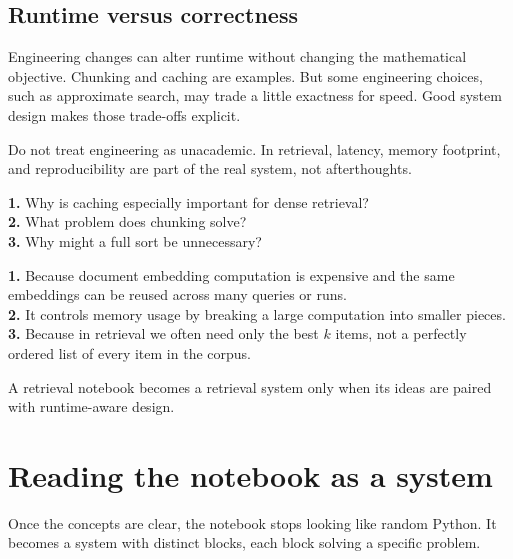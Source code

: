 \documentclass[11pt,oneside]{report}
\begin{document}
\section*{Runtime versus correctness}
Engineering changes can alter runtime without changing the mathematical objective. Chunking and caching are examples. But some engineering choices, such as approximate search, may trade a little exactness for speed. Good system design makes those trade-offs explicit.

\begin{warningbox}
Do not treat engineering as unacademic. In retrieval, latency, memory footprint, and reproducibility are part of the real system, not afterthoughts.
\end{warningbox}

\begin{selfcheckbox}
\textbf{1.} Why is caching especially important for dense retrieval?\\
\textbf{2.} What problem does chunking solve?\\
\textbf{3.} Why might a full sort be unnecessary?
\end{selfcheckbox}

\begin{answerbox}
\textbf{1.} Because document embedding computation is expensive and the same embeddings can be reused across many queries or runs.\\
\textbf{2.} It controls memory usage by breaking a large computation into smaller pieces.\\
\textbf{3.} Because in retrieval we often need only the best $k$ items, not a perfectly ordered list of every item in the corpus.
\end{answerbox}

\begin{rememberbox}
A retrieval notebook becomes a retrieval system only when its ideas are paired with runtime-aware design.
\end{rememberbox}


\chapter[Reading the Notebook as a System]{Reading the notebook as a system}

\begin{purposebox}
Once the concepts are clear, the notebook stops looking like random Python. It becomes a system with distinct blocks, each block solving a specific problem.
\end{purposebox}
\end{document}

